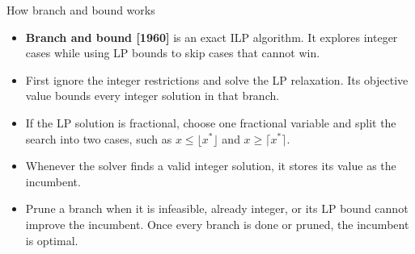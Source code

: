 \documentclass[aspectratio=169]{beamer}
\begin{document}
\begin{frame}{How branch and bound works}
\begin{itemize}[<+->]
\item \textbf{Branch and bound [1960]} is an exact ILP algorithm. It explores integer cases while using LP bounds to skip cases that cannot win.
\item First ignore the integer restrictions and solve the LP relaxation. Its objective value bounds every integer solution in that branch.
\item If the LP solution is fractional, choose one fractional variable and split the search into two cases, such as $x\leq\lfloor x^*\rfloor$ and $x\geq\lceil x^*\rceil$.
\item Whenever the solver finds a valid integer solution, it stores its value as the incumbent.
\item Prune a branch when it is infeasible, already integer, or its LP bound cannot improve the incumbent. Once every branch is done or pruned, the incumbent is optimal.
\end{itemize}
\end{frame}
\end{document}
